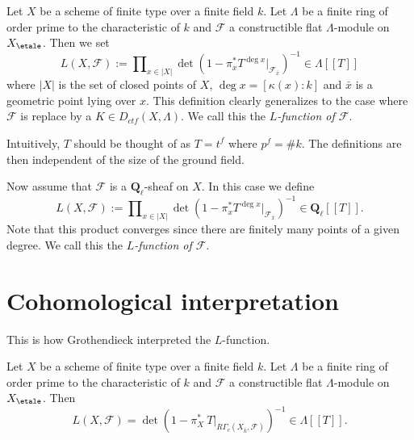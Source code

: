 \begin{definition}
\label{definition-L-function-finite-ring}
Let $X$ be a scheme of finite type over a finite field $k$. Let $\Lambda$ be a
finite ring of order prime to the characteristic of $k$ and $\mathcal{F}$ a
constructible flat $\Lambda$-module on $X_\etale$. Then we set
$$
L(X, \mathcal{F}) :=
\prod\nolimits_{x\in |X|}
\det(1 - \pi_x^*T^{\deg x} |_{\mathcal{F}_{\bar x}})^{-1} \in \Lambda [[ T ]]
$$
where $|X|$ is the set of closed points of $X$, $\deg x = [\kappa(x): k]$ and
$\bar x$ is a geometric point lying over $x$. This definition clearly
generalizes to the case where $\mathcal{F}$ is replace by a
$K \in D_{ctf}(X, \Lambda)$. We call this the {\it $L$-function of
$\mathcal{F}$}.
\end{definition}

\begin{remark}
\label{remark-T}
Intuitively, $T$ should be thought of as $T = t^f$ where $p^f = \# k$. The
definitions are then independent of the size of the ground field.
\end{remark}

\begin{definition}
\label{definition-L-function-l-adic}
Now assume that $\mathcal{F}$ is a $\mathbf{Q}_\ell$-sheaf on $X$.
In this case we define
$$
L(X, \mathcal{F}) :=
\prod\nolimits_{x \in |X|}
\det(1 - \pi_x^*T^{\deg x} |_{\mathcal{F}_{\bar x}})^{-1}
\in \mathbf{Q}_\ell[[T]].
$$
Note that this product converges since there are finitely many points of a
given degree. We call this the {\it $L$-function of
$\mathcal{F}$}.
\end{definition}




\section{Cohomological interpretation}
\label{section-L-cohomological}

\noindent
This is how Grothendieck interpreted the $L$-function.

\begin{theorem}
\label{theorem-A}
Let $X$ be a scheme of finite type over a finite field $k$. Let $\Lambda$ be a
finite ring of order prime to the characteristic of $k$ and $\mathcal{F}$ a
constructible flat $\Lambda$-module on $X_\etale$. Then
$$
L(X, \mathcal{F}) =
\det(1 - \pi_X^*\ T |_{R\Gamma_c(X_{\bar k}, \mathcal{F})})^{-1}
\in \Lambda[[T]].
$$
\end{theorem}

